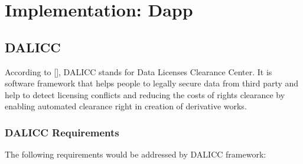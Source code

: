 \chapter{Implementation: Dapp}
\section{DALICC}
According to [], DALICC stands for Data Licenses Clearance Center. It is software framework that helps people to legally secure data from third party and help to detect licensing conflicts and reducing the costs of rights clearance by enabling automated clearance right in creation of derivative works. 
\subsection{DALICC Requirements}
The following requirements would be addressed by DALICC framework:\\
